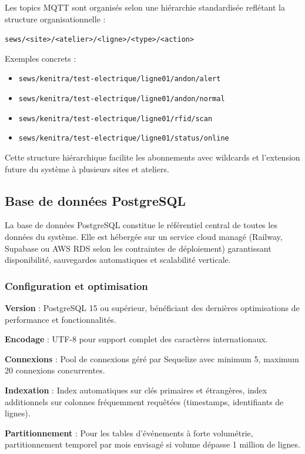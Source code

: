 Les topics MQTT sont organisés selon une hiérarchie standardisée reflétant la structure organisationnelle :

\texttt{sews/<site>/<atelier>/<ligne>/<type>/<action>}

Exemples concrets :
\begin{itemize}
    \item \texttt{sews/kenitra/test-electrique/ligne01/andon/alert}
    \item \texttt{sews/kenitra/test-electrique/ligne01/andon/normal}
    \item \texttt{sews/kenitra/test-electrique/ligne01/rfid/scan}
    \item \texttt{sews/kenitra/test-electrique/ligne01/status/online}
\end{itemize}

Cette structure hiérarchique facilite les abonnements avec wildcards et l'extension future du système à plusieurs sites et ateliers.


\subsection{Base de données PostgreSQL}

La base de données PostgreSQL constitue le référentiel central de toutes les données du système. Elle est hébergée sur un service cloud managé (Railway, Supabase ou AWS RDS selon les contraintes de déploiement) garantissant disponibilité, sauvegardes automatiques et scalabilité verticale.

\subsubsection{Configuration et optimisation}

\textbf{Version} : PostgreSQL 15 ou supérieur, bénéficiant des dernières optimisations de performance et fonctionnalités.

\textbf{Encodage} : UTF-8 pour support complet des caractères internationaux.

\textbf{Connexions} : Pool de connexions géré par Sequelize avec minimum 5, maximum 20 connexions concurrentes.

\textbf{Indexation} : Index automatiques sur clés primaires et étrangères, index additionnels sur colonnes fréquemment requêtées (timestamps, identifiants de lignes).

\textbf{Partitionnement} : Pour les tables d'événements à forte volumétrie, partitionnement temporel par mois envisagé si volume dépasse 1 million de lignes.

